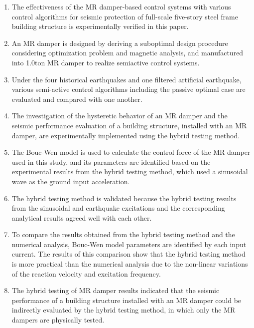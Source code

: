 \begin{enumerate}
\item The effectiveness of the MR damper-based control systems with various control algorithms for seismic protection of full-scale five-story steel frame building structure is experimentally verified in this paper.
\item An MR damper is designed by deriving a suboptimal design procedure considering optimization problem and magnetic analysis, and manufactured into 1.0ton MR damper to realize semiactive control systems.
\item Under the four historical earthquakes and one filtered artificial earthquake, various semi-active control algorithms including the passive optimal case are evaluated and compared with one another.
\item The investigation of the hysteretic behavior of an MR damper and the seismic performance evaluation of a building structure, installed with an MR damper, are experimentally implemented using the hybrid testing method.
\item The Bouc-Wen model is used to calculate the control force of the MR damper used in this study, and its parameters are identified based on the experimental results from the hybrid testing method, which used a sinusoidal wave as the ground input acceleration.
\item The hybrid testing method is validated because the hybrid testing results from the sinusoidal and earthquake excitations and the corresponding analytical results agreed well with each other.
\item To compare the results obtained from the hybrid testing method and the numerical analysis, Bouc-Wen model parameters are identified by each input current. The results of this comparison show that the hybrid testing method is more practical than the numerical analysis due to the non-linear variations of the reaction velocity and excitation frequency.
\item The hybrid testing of MR damper results indicated that the seismic performance of a building structure installed with an MR damper could be indirectly evaluated by the hybrid testing method, in which only the MR dampers are physically tested.
\end{enumerate}
